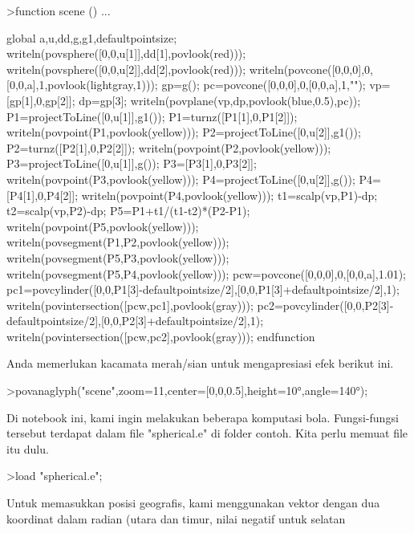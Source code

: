 \documentclass[12pt,Times new roman,letterpaper]{book}
\begin{document}
\begin{eulernootebook}
\begin{eulercomment}
\begin{eulercomment}
\begin{eulernootebook}
\begin{eulercomment}
\begin{eulercomment}
\begin{eulercomment}
\begin{eulercomment}
\begin{eulercomment}
\begin{eulercomment}
\begin{eulernotebook}
\begin{eulercomment}
\begin{eulercomment}
\begin{eulercomment}
\begin{eulercomment}
\begin{eulercomment}
\begin{eulerprompt}
>function scene () ...
\end{eulerprompt}
\begin{eulerudf}
  global a,u,dd,g,g1,defaultpointsize;
  writeln(povsphere([0,0,u[1]],dd[1],povlook(red)));
  writeln(povsphere([0,0,u[2]],dd[2],povlook(red)));
  writeln(povcone([0,0,0],0,[0,0,a],1,povlook(lightgray,1)));
  gp=g();
  pc=povcone([0,0,0],0,[0,0,a],1,"");
  vp=[gp[1],0,gp[2]]; dp=gp[3];
  writeln(povplane(vp,dp,povlook(blue,0.5),pc));
  P1=projectToLine([0,u[1]],g1()); P1=turnz([P1[1],0,P1[2]]);
  writeln(povpoint(P1,povlook(yellow)));
  P2=projectToLine([0,u[2]],g1()); P2=turnz([P2[1],0,P2[2]]);
  writeln(povpoint(P2,povlook(yellow)));
  P3=projectToLine([0,u[1]],g()); P3=[P3[1],0,P3[2]];
  writeln(povpoint(P3,povlook(yellow)));
  P4=projectToLine([0,u[2]],g()); P4=[P4[1],0,P4[2]];
  writeln(povpoint(P4,povlook(yellow)));
  t1=scalp(vp,P1)-dp; t2=scalp(vp,P2)-dp; P5=P1+t1/(t1-t2)*(P2-P1);
  writeln(povpoint(P5,povlook(yellow)));
  writeln(povsegment(P1,P2,povlook(yellow)));
  writeln(povsegment(P5,P3,povlook(yellow)));
  writeln(povsegment(P5,P4,povlook(yellow)));
  pcw=povcone([0,0,0],0,[0,0,a],1.01);
  pc1=povcylinder([0,0,P1[3]-defaultpointsize/2],[0,0,P1[3]+defaultpointsize/2],1);
  writeln(povintersection([pcw,pc1],povlook(gray)));
  pc2=povcylinder([0,0,P2[3]-defaultpointsize/2],[0,0,P2[3]+defaultpointsize/2],1);
  writeln(povintersection([pcw,pc2],povlook(gray)));
  endfunction
\end{eulerudf}
\begin{eulercomment}
Anda memerlukan kacamata merah/sian untuk mengapresiasi efek berikut
ini.
\end{eulercomment}
\begin{eulerprompt}
>povanaglyph("scene",zoom=11,center=[0,0,0.5],height=10°,angle=140°);
\end{eulerprompt}
\begin{eulercomment}
Di notebook ini, kami ingin melakukan beberapa komputasi bola.
Fungsi-fungsi tersebut terdapat dalam file "spherical.e" di folder
contoh. Kita perlu memuat file itu dulu.
\end{eulercomment}
\begin{eulerprompt}
>load "spherical.e";
\end{eulerprompt}
\begin{eulercomment}
Untuk memasukkan posisi geografis, kami menggunakan vektor dengan dua
koordinat dalam radian (utara dan timur, nilai negatif untuk selatan

\end{eulercomment}
\end{eulercomment}
\end{eulercomment}
\end{eulercomment}
\end{eulercomment}
\end{eulercomment}
\end{eulernotebook}
\end{eulercomment}
\end{eulercomment}
\end{eulercomment}
\end{eulercomment}
\end{eulercomment}
\end{eulercomment}
\end{eulernootebook}
\end{eulercomment}
\end{eulercomment}
\end{eulernootebook}
\end{document}
